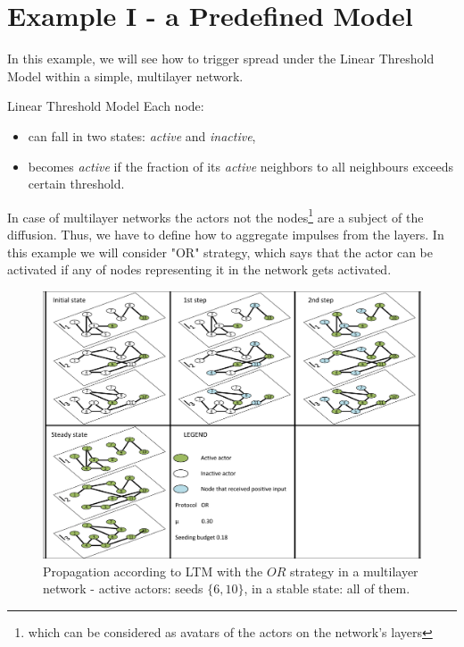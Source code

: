\documentclass{beamer}
\begin{document}
\section{Example I - a Predefined Model}

\begin{frame}{\secname}
    In this example, we will see how to trigger spread under the Linear Threshold Model within a 
    simple, multilayer network.
    \begin{block}{Linear Threshold Model}
    Each node:
    \begin{itemize}
        \item can fall in two states: \textit{active} and \textit{inactive},
        \item becomes \textit{active} if the fraction of its \textit{active} neighbors to all neighbours
        exceeds certain threshold.
    \end{itemize}
    \end{block}
    In case of multilayer networks the actors not the nodes\footnote{which can be considered as avatars
    of the actors on the network's layers} are a subject of the diffusion. Thus, we have to define
    how to aggregate impulses from the layers. In this example we will consider "OR" strategy, which 
    says that the actor can be activated if any of nodes representing it in the network gets activated.
\end{frame}

\begin{frame}{\secname}
    \begin{figure}
        \centering
        \includegraphics[width=.75\textwidth]{figures/ltm_example_or.pdf}
        \caption{Propagation according to LTM with the $OR$ strategy in a multilayer network -
        active actors: seeds $\{6, 10\}$, in a stable state: all of them.}
    \end{figure}
\end{frame}
\end{document}
